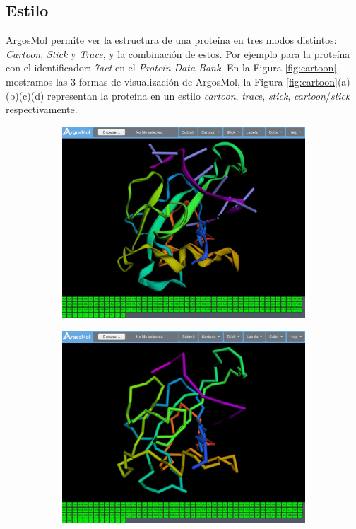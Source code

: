 \documentclass{article}
\begin{document}
\subsection{Estilo}

ArgosMol permite ver la estructura de una proteína en tres modos distintos: \textit{Cartoon}, \textit{Stick} y \textit{Trace}, y la combinación de estos. Por ejemplo para la proteína con el identificador: \textit{7act} en el \textit{Protein Data Bank}. En la Figura \ref{fig:cartoon}, mostramos las 3 formas de visualización de ArgosMol, la Figura \ref{fig:cartoon}(a)(b)(c)(d) representan la proteína en un estilo \textit{cartoon}, \textit{trace}, \textit{stick}, \textit{cartoon}/\textit{stick} respectivamente. \\

\begin{figure}[H]
	\begin{subfigure}{.5\textwidth}
		\centering
		\includegraphics[width=.99\linewidth]{img/argosmol/mol2}
		\caption{}
		\label{fig:sfig1}
	\end{subfigure}%
	\begin{subfigure}{.5\textwidth}
		\centering
		\includegraphics[width=.99\linewidth]{img/argosmol/mol3}

\end{subfigure}
\end{figure}
\end{document}
